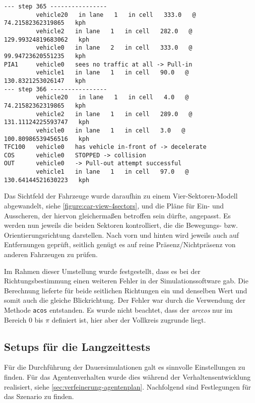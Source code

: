 \footnotesize\begin{verbatim}
--- step 365 ----------------
         vehicle20   in lane   1   in cell   333.0   @   74.21582362319865   kph
         vehicle2   in lane   1   in cell   282.0   @   129.99324819683062   kph
         vehicle0   in lane   2   in cell   333.0   @   99.94723620551235   kph
PIA1     vehicle0   sees no traffic at all -> Pull-in
         vehicle1   in lane   1   in cell   90.0   @   130.8321253026147   kph
--- step 366 ----------------
         vehicle20   in lane   1   in cell   4.0   @   74.21582362319865   kph
         vehicle2   in lane   1   in cell   289.0   @   131.11124225593747   kph
         vehicle0   in lane   1   in cell   3.0   @   100.80986539456516   kph
TFC100   vehicle0   has vehicle in-front of -> decelerate
COS      vehicle0   STOPPED -> collision
OUT      vehicle0   -> Pull-out attempt successful
         vehicle1   in lane   1   in cell   97.0   @   130.64144521630223   kph
\end{verbatim}
\normalsize

Das Sichtfeld der Fahrzeuge wurde daraufhin zu einem Vier-Sektoren-Modell abgewandelt, siehe \cref{figure:car-view-4sectors}, und die Pläne für Ein- und Ausscheren, der hiervon gleichermaßen betroffen sein dürfte, angepasst.
Es werden nun jeweils die beiden Sektoren kontrolliert, die die Bewegungs- bzw. Orientierungsrichtung darstellen. 
Nach vorn und hinten wird jeweils auch auf Entfernungen geprüft, seitlich genügt es auf reine Präsenz/Nichtpräsenz von anderen Fahrzeugen zu prüfen.

Im Rahmen dieser Umstellung wurde festgestellt, dass es bei der Richtungsbestimmung einen weiteren Fehler in der Simulationssoftware gab.
Die Berechnung lieferte für beide seitlichen Richtungen ein und denselben Wert und somit auch die gleiche Blickrichtung.
Der Fehler war durch die Verwendung der Methode \texttt{acos} entstanden. Es wurde nicht beachtet, dass der \textit{arccos} nur im Bereich 0 bis $ \pi $ definiert ist, hier aber der Vollkreis zugrunde liegt.





\subsection{Setups für die Langzeittests}
\label{sec:setup-dauertests}

Für die Durchführung der Dauersimulationen galt es sinnvolle Einstellungen zu finden. 
Für das Agentenverhalten wurde dies während der Verhaltensentwicklung realisiert, siehe \cref{sec:verfeinerung-agentenplan}. 
Nachfolgend sind Festlegungen für das Szenario zu finden.



